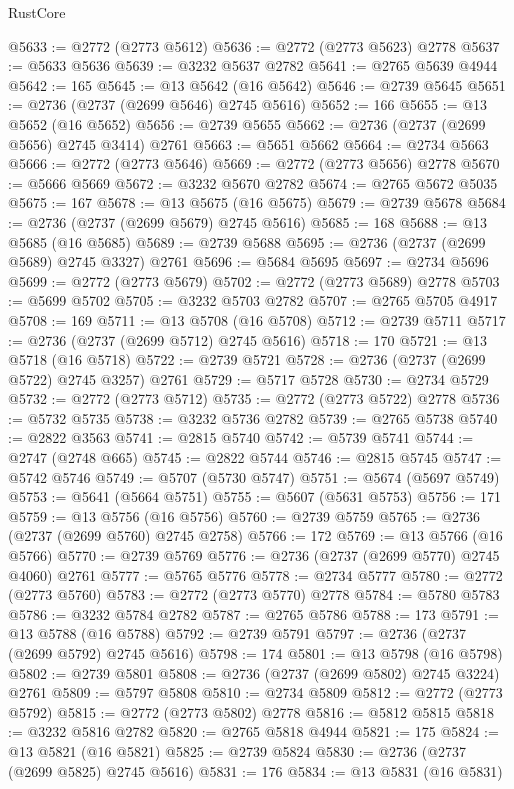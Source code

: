 \begin{lexlean}{RustCore}
\begin{coremodule}
@5633 := @2772 (@2773 @5612)
@5636 := @2772 (@2773 @5623) @2778
@5637 := @5633 @5636
@5639 := @3232 @5637 @2782
@5641 := @2765 @5639 @4944
@5642 := 165
@5645 := @13 @5642 (@16 @5642)
@5646 := @2739 @5645
@5651 := @2736 (@2737 (@2699 @5646) @2745 @5616)
@5652 := 166
@5655 := @13 @5652 (@16 @5652)
@5656 := @2739 @5655
@5662 := @2736 (@2737 (@2699 @5656) @2745 @3414) @2761
@5663 := @5651 @5662
@5664 := @2734 @5663
@5666 := @2772 (@2773 @5646)
@5669 := @2772 (@2773 @5656) @2778
@5670 := @5666 @5669
@5672 := @3232 @5670 @2782
@5674 := @2765 @5672 @5035
@5675 := 167
@5678 := @13 @5675 (@16 @5675)
@5679 := @2739 @5678
@5684 := @2736 (@2737 (@2699 @5679) @2745 @5616)
@5685 := 168
@5688 := @13 @5685 (@16 @5685)
@5689 := @2739 @5688
@5695 := @2736 (@2737 (@2699 @5689) @2745 @3327) @2761
@5696 := @5684 @5695
@5697 := @2734 @5696
@5699 := @2772 (@2773 @5679)
@5702 := @2772 (@2773 @5689) @2778
@5703 := @5699 @5702
@5705 := @3232 @5703 @2782
@5707 := @2765 @5705 @4917
@5708 := 169
@5711 := @13 @5708 (@16 @5708)
@5712 := @2739 @5711
@5717 := @2736 (@2737 (@2699 @5712) @2745 @5616)
@5718 := 170
@5721 := @13 @5718 (@16 @5718)
@5722 := @2739 @5721
@5728 := @2736 (@2737 (@2699 @5722) @2745 @3257) @2761
@5729 := @5717 @5728
@5730 := @2734 @5729
@5732 := @2772 (@2773 @5712)
@5735 := @2772 (@2773 @5722) @2778
@5736 := @5732 @5735
@5738 := @3232 @5736 @2782
@5739 := @2765 @5738
@5740 := @2822 @3563
@5741 := @2815 @5740
@5742 := @5739 @5741
@5744 := @2747 (@2748 @665)
@5745 := @2822 @5744
@5746 := @2815 @5745
@5747 := @5742 @5746
@5749 := @5707 (@5730 @5747)
@5751 := @5674 (@5697 @5749)
@5753 := @5641 (@5664 @5751)
@5755 := @5607 (@5631 @5753)
@5756 := 171
@5759 := @13 @5756 (@16 @5756)
@5760 := @2739 @5759
@5765 := @2736 (@2737 (@2699 @5760) @2745 @2758)
@5766 := 172
@5769 := @13 @5766 (@16 @5766)
@5770 := @2739 @5769
@5776 := @2736 (@2737 (@2699 @5770) @2745 @4060) @2761
@5777 := @5765 @5776
@5778 := @2734 @5777
@5780 := @2772 (@2773 @5760)
@5783 := @2772 (@2773 @5770) @2778
@5784 := @5780 @5783
@5786 := @3232 @5784 @2782
@5787 := @2765 @5786
@5788 := 173
@5791 := @13 @5788 (@16 @5788)
@5792 := @2739 @5791
@5797 := @2736 (@2737 (@2699 @5792) @2745 @5616)
@5798 := 174
@5801 := @13 @5798 (@16 @5798)
@5802 := @2739 @5801
@5808 := @2736 (@2737 (@2699 @5802) @2745 @3224) @2761
@5809 := @5797 @5808
@5810 := @2734 @5809
@5812 := @2772 (@2773 @5792)
@5815 := @2772 (@2773 @5802) @2778
@5816 := @5812 @5815
@5818 := @3232 @5816 @2782
@5820 := @2765 @5818 @4944
@5821 := 175
@5824 := @13 @5821 (@16 @5821)
@5825 := @2739 @5824
@5830 := @2736 (@2737 (@2699 @5825) @2745 @5616)
@5831 := 176
@5834 := @13 @5831 (@16 @5831)

\end{coremodule}
\end{lexlean}
